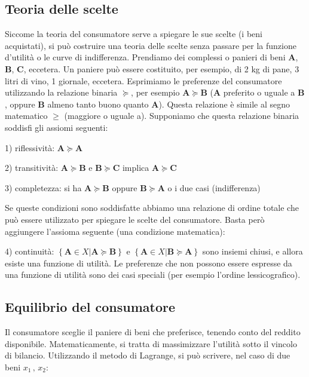 \subsection{Teoria delle scelte}

Siccome la teoria del consumatore serve a spiegare le sue scelte (i beni 
acquistati), si può costruire una teoria delle scelte senza passare per la 
funzione d'utilità o le curve di indifferenza. Prendiamo dei complessi o panieri 
di beni \(\mathbf{A}\), \(\mathbf{B}\), \(\mathbf{C}\), eccetera. 
Un paniere può essere costituito, per 
esempio, di 2 kg di pane, 3 litri di vino, 1 giornale, eccetera. Esprimiamo le 
preferenze del consumatore utilizzando la relazione binaria \(\succcurlyeq\), 
per esempio \(\mathbf{A}\succcurlyeq\mathbf{B}\) 
(\(\mathbf{A}\) preferito o uguale a \(\mathbf{B}\), 
oppure \(\mathbf{B}\) almeno tanto buono quanto \(\mathbf{A}\)). 
Questa relazione è simile al segno 
matematico \(\ge\) (maggiore o uguale a). Supponiamo che questa 
relazione binaria soddisfi gli assiomi seguenti:

1) riflessività: \(\mathbf{A}\succcurlyeq\mathbf{A}\)

2) transitività: \(\mathbf{A}\succcurlyeq\mathbf{B}\) e 
\(\mathbf{B}\succcurlyeq\mathbf{C}\) implica 
\(\mathbf{A}\succcurlyeq\mathbf{C}\)

3) completezza: si ha \(\mathbf{A}\succcurlyeq\mathbf{B}\) oppure 
\(\mathbf{B}\succcurlyeq\mathbf{A}\) o i due casi (indifferenza)

Se queste condizioni sono soddisfatte abbiamo una relazione di ordine totale 
che può essere utilizzato per spiegare le scelte del consumatore. 
Basta però aggiungere l'assioma seguente (una condizione matematica):

4) continuità: \(\left \{ \mathbf{A} \in X | \mathbf{A} \succcurlyeq 
\mathbf{B} \right \}\) e \(\left \{ \mathbf{A} \in X | \mathbf{B} 
\succcurlyeq \mathbf{A} \right \}\) sono insiemi chiusi,
e allora esiste una funzione di utilità. 
Le preferenze che non possono essere espresse da una funzione di utilità sono 
dei casi speciali (per esempio l'ordine lessicografico).

\subsection{Equilibrio del consumatore}

Il consumatore sceglie il paniere di beni che preferisce, tenendo conto del 
reddito disponibile. Matematicamente, si tratta di massimizzare l'utilità sotto 
il vincolo di bilancio. Utilizzando il metodo di Lagrange, si può scrivere, 
nel caso di due beni \( x_1 \, , \, x_2 \):

